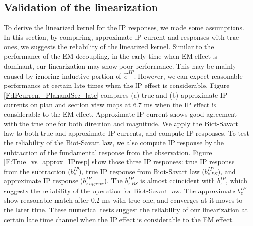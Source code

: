 \documentclass[a4paper, 11pt]{article}
\newcommand {\e}  { {\vec e} }
\newcommand{\bzip}{b_z^{IP}}
\begin{document}
\subsection{Validation of the linearization}
To derive the linearized kernel for the IP responses, we made some assumptions. 
In this section, by comparing, approximate IP current and responses with true ones, we suggests the reliability of the linearized kernel. 
Similar to the performance of the EM decoupling, in the early time when EM effect is dominant, our linearization may show poor performance. 
This may be mainly caused by ignoring inductive portion of $\e^{IP}$. 
However, we can expect reasonable performance at certain late times when the IP effect is considerable. 
Figure \ref{F:IPcurrent_PlanandSec_late} compares (a) true and (b) approximate IP currents on plan and section view maps at 6.7 ms when the IP effect is considerable to the EM effect. 
Approximate IP current shows good agreement with the true one for both direction and magnitude. 
We apply the Biot-Savart law to both true and approximate IP currents, and compute IP responses. 
To test the reliability of the Biot-Savart law, we also compute IP response by the subtraction of the fundamental response from the observation. 
Figure \ref{F:True_vs_approx_IPresp} show those three IP responses: true IP response from the subtraction ($b_z^{IP}$), true IP response from Biot-Savart law ($b_{z \ BS}^{IP}$), and approximate IP response ($b_{z \ approx}^{IP}$). 
The $b^{IP}_{z \ BS}$ is almost coincident with $\bzip$, which suggests the reliability of the operation for Biot-Savart law. 
The approximate $\bzip$ show reasonable match after 0.2 ms with true one, and converges at it moves to the later time. 
These numerical tests suggest the reliability of our linearization at certain late time channel when the IP effect is considerable to the EM effect. 
\end{document}
